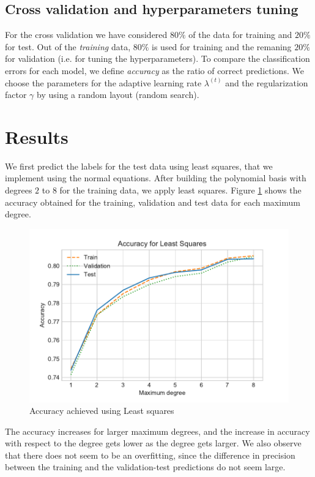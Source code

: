 \documentclass[10pt,conference,compsocconf]{IEEEtran}
\begin{document}
	\subsection{Cross validation and hyperparameters tuning} %
	\label{sub:cross_validation_and_hyperparameters_tuning}
  	For the cross validation we have considered $80\%$ of the data for training and $20\%$ for test. Out of the \emph{training} data, $80\%$ is used for training and the remaning $20\%$ for validation (i.e. for tuning the hyperparameters). To compare the classification errors for each model, we define \emph{accuracy} as the ratio of correct predictions.	We choose the parameters for the adaptive learning rate $\lambda^{(t)}$ and the regularization factor $\gamma$ by using a random layout (random search).

\section{Results}
\label{sec:results}
    We first predict the labels for the test data using least squares, that we implement using the normal equations. After building the polynomial basis with degrees $2$ to $8$ for the training data, we apply least squares. Figure \ref{fig:LSprec} shows the accuracy obtained for the training, validation and test data for each maximum degree.

    \begin{figure}[htp]
      \centering
      \includegraphics[width=.45\textwidth]{LSprec}
      \caption{Accuracy achieved using Least squares}
      \label{fig:LSprec}
    \end{figure}


    The accuracy increases for larger maximum degrees, and the increase in accuracy with respect to the degree gets lower as the degree gets larger. We also observe that there does not seem to be an overfitting, since the difference in precision between the training and the validation-test predictions do not seem large.
\end{document}
